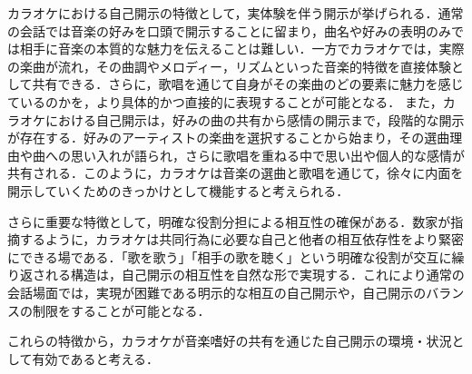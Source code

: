 カラオケにおける自己開示の特徴として，実体験を伴う開示が挙げられる．通常の会話では音楽の好みを口頭で開示することに留まり，曲名や好みの表明のみでは相手に音楽の本質的な魅力を伝えることは難しい．一方でカラオケでは，実際の楽曲が流れ，その曲調やメロディー，リズムといった音楽的特徴を直接体験として共有できる．さらに，歌唱を通じて自身がその楽曲のどの要素に魅力を感じているのかを，より具体的かつ直接的に表現することが可能となる．
また，カラオケにおける自己開示は，好みの曲の共有から感情の開示まで，段階的な開示が存在する．好みのアーティストの楽曲を選択することから始まり，その選曲理由や曲への思い入れが語られ，さらに歌唱を重ねる中で思い出や個人的な感情が共有される．このように，カラオケは音楽の選曲と歌唱を通じて，徐々に内面を開示していくためのきっかけとして機能すると考えられる．

さらに重要な特徴として，明確な役割分担による相互性の確保がある．数家\cite{数家鉄治_2008}が指摘するように，カラオケは共同行為に必要な自己と他者の相互依存性をより緊密にできる場である．「歌を歌う」「相手の歌を聴く」という明確な役割が交互に繰り返される構造は，自己開示の相互性を自然な形で実現する．これにより通常の会話場面では，実現が困難である明示的な相互の自己開示や，自己開示のバランスの制限をすることが可能となる．

これらの特徴から，カラオケが音楽嗜好の共有を通じた自己開示の環境・状況として有効であると考える．